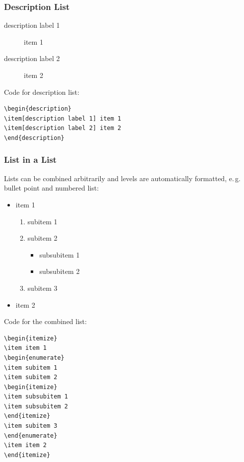 \documentclass{pharmrep}
\newcommand{\eg}{e.\,g.\xspace}
\begin{document}
\subsubsection{Description List}
\begin{description}
\item[description label 1] item 1
\item[description label 2] item 2
\end{description}

Code for description list:
\begin{verbatim}
\begin{description}
\item[description label 1] item 1
\item[description label 2] item 2
\end{description}
\end{verbatim}

\subsubsection{List in a List}
Lists can be combined arbitrarily and levels are automatically formatted, \eg bullet point and numbered
list:
\begin{itemize}
\item item 1
\begin{enumerate}
\item subitem 1
\item subitem 2
\begin{itemize}
\item subsubitem 1
\item subsubitem 2
\end{itemize}
\item subitem 3
\end{enumerate}
\item item 2
\end{itemize}

Code for the combined list:
\begin{verbatim}
\begin{itemize}
\item item 1
\begin{enumerate}
\item subitem 1
\item subitem 2
\begin{itemize}
\item subsubitem 1
\item subsubitem 2
\end{itemize}
\item subitem 3
\end{enumerate}
\item item 2
\end{itemize}
\end{verbatim}
\end{document}
